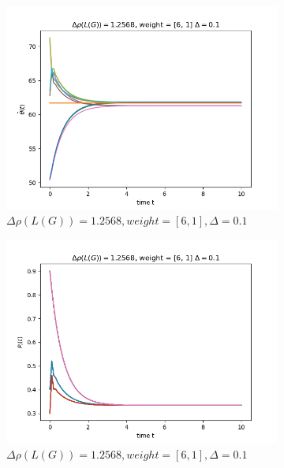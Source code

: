 \documentclass{article}
\begin{document}
\begin{problem}
\begin{figure}[!h]
        \begin{subfigure}{0.4\textwidth}
            \includegraphics[width=\textwidth]{./img/Figure_10.png}
            \caption{$\Delta \rho (L(G)) = 1.2568, weight = [6,1], \Delta = 0.1$ }
        \end{subfigure}
        \begin{subfigure}{0.4\textwidth}
            \includegraphics[width=\textwidth]{./img/Figure_11.png}
            \caption{$\Delta \rho (L(G)) = 1.2568, weight = [6,1], \Delta = 0.1$ }
        \end{subfigure}
        \begin{subfigure}{0.4\textwidth}

\end{subfigure}
\end{figure}
\end{problem}
\end{document}
